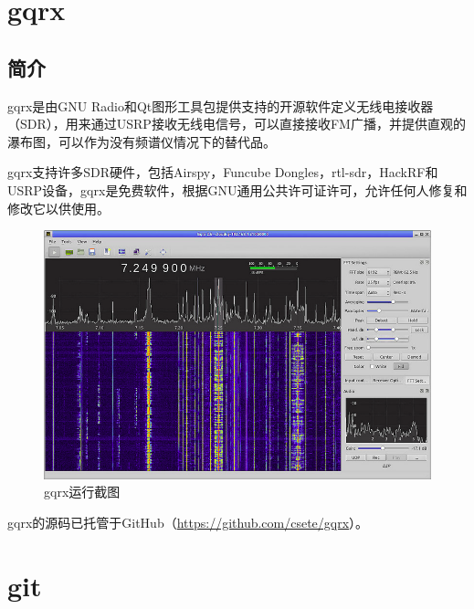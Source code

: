 	\section{gqrx}
		\subsection{简介}
			\par gqrx是由GNU Radio和Qt图形工具包提供支持的开源软件定义无线电接收器（SDR），用来通过USRP接收无线电信号，可以直接接收FM广播，并提供直观的瀑布图，可以作为没有频谱仪情况下的替代品。
			\par gqrx支持许多SDR硬件，包括Airspy，Funcube Dongles，rtl-sdr，HackRF和USRP设备，gqrx是免费软件，根据GNU通用公共许可证许可，允许任何人修复和修改它以供使用。
			\begin{figure}[htbp]
				\centering
				\includegraphics[width=13cm]{figures/gqrx.png}
				\caption{gqrx运行截图}
				\label{fig:gqrx运行截图}
			\end{figure}
			\par gqrx的源码已托管于GitHub（\href{https://github.com/csete/gqrx}{https://github.com/csete/gqrx}）。
	\section{git}
